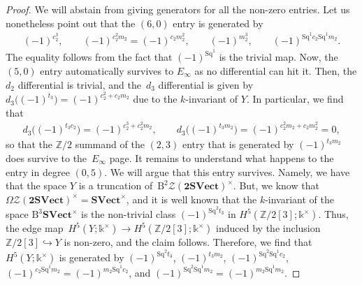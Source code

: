 \documentclass[pdftex]{sigma}
\numberwithin{equation}{section}
\begin{document}
\begin{proof}
We will abstain from giving generators for all the non-zero entries. Let us nonetheless point out that the $(6,0)$ entry is generated by
\begin{gather*}
(-1)^{c_2^3},\qquad (-1)^{c_2^2m_2}=(-1)^{c_2m_2^2},\qquad (-1)^{m_2^3},\qquad (-1)^{\mathrm{Sq}^1c_2 \mathrm{Sq}^1m_2}.
\end{gather*}
 The equality follows from the fact that $(-1)^{\mathrm{Sq}^1}$ is the trivial map. Now, the $(5,0)$ entry automatically survives to $E_{\infty}$ as no differential can hit it. Then, the $d_2$ differential is trivial, and the~$d_3$ differential is given by $d_3\big((-1)^{t_3}\big)=(-1)^{c_2^2+c_2m_2}$ due to the $k$-invariant of $Y$. In particular, we find that
 \begin{gather*}
 d_3\big((-1)^{t_3c_2}\big)=(-1)^{c_2^3+c_2^2m_2},\qquad d_3\big((-1)^{t_3m_2}\big)=(-1)^{c_2^2m_2+c_2m_2^2}=0,
 \end{gather*}
 so that the $\mathbb{Z}/2$ summand of the $(2,3)$ entry that is generated by $(-1)^{t_3m_2}$ does survive to the~$E_{\infty}$ page. It remains to understand what happens to the entry in degree $(0,5)$. We will argue that this entry survives. Namely, we have that the space $Y$ is a truncation of~$\mathrm{B}^2\mathscr{Z}(\mathbf{2SVect})^{\times}$. But, we know that $\Omega\mathscr{Z}(\mathbf{2SVect})^{\times}=\mathbf{SVect}^{\times}$, and it is well known that the $k$-invariant of the space $\mathrm{B}^3\mathbf{SVect}^{\times}$ is the non-trivial class $(-1)^{\mathrm{Sq}^2t_3}$ in $H^5(\mathbb{Z}/2[3];\mathds{k}^{\times})$. Thus, the edge map~$H^5(Y;\mathds{k}^{\times})\rightarrow H^5(\mathbb{Z}/2[3];\mathds{k}^{\times})$ induced by the inclusion $\mathbb{Z}/2[3]\hookrightarrow Y$ is non-zero, and the claim follows. Therefore, we find that $H^5(Y;\mathds{k}^{\times})$ is generated by $(-1)^{\mathrm{Sq}^2t_3}$, $(-1)^{t_3m_2}$, $(-1)^{\mathrm{Sq}^2\mathrm{Sq}^1c_2}$, $(-1)^{c_2\mathrm{Sq}^1m_2}=(-1)^{m_2\mathrm{Sq}^1c_2}$, and $(-1)^{\mathrm{Sq}^2\mathrm{Sq}^1m_2}=(-1)^{m_2\mathrm{Sq}^1m_2}$.


\end{proof}
\end{document}
